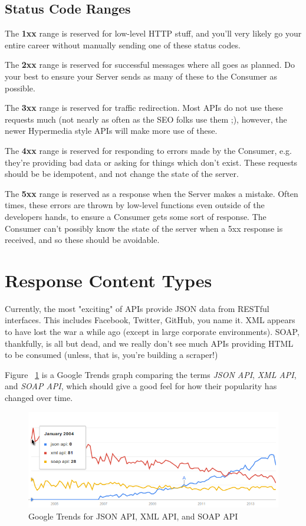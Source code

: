 \documentclass{book}
\begin{document}
\subsection{Status Code Ranges}

The \textbf{1xx} range is reserved for low-level HTTP stuff, and you'll very likely go your entire career without manually sending one of these status codes.

The \textbf{2xx} range is reserved for successful messages where all goes as planned. Do your best to ensure your Server sends as many of these to the Consumer as possible.

The \textbf{3xx} range is reserved for traffic redirection. Most APIs do not use these requests much (not nearly as often as the SEO folks use them ;), however, the newer Hypermedia style APIs will make more use of these.

The \textbf{4xx} range is reserved for responding to errors made by the Consumer, e.g. they're providing bad data or asking for things which don't exist. These requests should be be idempotent, and not change the state of the server.

The \textbf{5xx} range is reserved as a response when the Server makes a mistake. Often times, these errors are thrown by low-level functions even outside of the developers hands, to ensure a Consumer gets some sort of response. The Consumer can't possibly know the state of the server when a 5xx response is received, and so these should be avoidable.


\section{Response Content Types}

Currently, the most "exciting" of APIs provide JSON data from RESTful interfaces. This includes Facebook, Twitter, GitHub, you name it. XML appears to have lost the war a while ago (except in large corporate environments). SOAP, thankfully, is all but dead, and we really don't see much APIs providing HTML to be consumed (unless, that is, you're building a scraper!)

Figure ~\ref{fig:googletrends} is a Google Trends graph comparing the terms \emph{JSON API}, \emph{XML API}, and \emph{SOAP API}, which should give a good feel for how their popularity has changed over time.

\begin{figure}[ht!]
\centering
\includegraphics[width=120mm]{images/xml-vs-json-vs-soap-google-trends.png}
\caption{Google Trends for JSON API, XML API, and SOAP API}
\label{fig:googletrends}
\end{figure}
\end{document}
